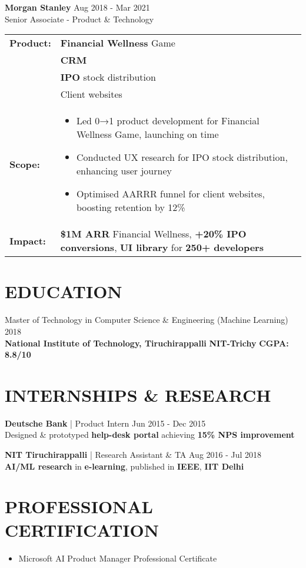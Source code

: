 \documentclass[10pt,a4paper]{article}
\newcommand{\experienceitem}[4]{
    #1 \hfill #2 \\
    #3 \hfill \textit{#4}
}
\newcommand{\educationitem}[4]{
    #1 \hfill #2 \\
    #3 \hfill #4
}
\begin{document}
\experienceitem{\textbf{Morgan Stanley}}{Aug 2018 - Mar 2021}{Senior Associate - Product \& Technology}{}

{\renewcommand{\arraystretch}{1.2}
\begin{tabularx}{\textwidth}{|>{\raggedright\arraybackslash}p{1.8cm}|X|}
\hline
\textbf{Product:} & \textbf{Financial Wellness} Game \\ & \textbf{CRM} \\ & \textbf{IPO} stock distribution \\ & Client websites \\ \hline
\textbf{Scope:} & \begin{itemize}[leftmargin=*,nosep]
    \item Led 0→1 product development for Financial Wellness Game, launching on time
    \item Conducted UX research for IPO stock distribution, enhancing user journey
    \item Optimised AARRR funnel for client websites, boosting retention by 12\%
\end{itemize} \\ \hline
\textbf{Impact:} & \textbf{\$1M ARR} Financial Wellness, \textbf{+20\% IPO conversions}, \textbf{UI library} for \textbf{250+ developers} \\ \hline
\end{tabularx}}

\section{EDUCATION}

\educationitem{Master of Technology in Computer Science \& Engineering (Machine Learning)}{ 2018}{\textbf{National Institute of Technology, Tiruchirappalli} \textbf{NIT-Trichy}}{\textbf{CGPA: 8.8/10}}

\section{INTERNSHIPS \& RESEARCH}

\textbf{Deutsche Bank} | Product Intern \hfill Jun 2015 - Dec 2015 \\
Designed \& prototyped \textbf{help-desk portal} achieving \textbf{15\% NPS improvement}

\textbf{NIT Tiruchirappalli} | Research Assistant \& TA \hfill Aug 2016 - Jul 2018 \\
\textbf{AI/ML research} in \textbf{e-learning}, published in \textbf{IEEE}, \textbf{IIT Delhi}

\section{PROFESSIONAL CERTIFICATION}

\begin{itemize}[leftmargin=*]
    \item Microsoft AI Product Manager Professional Certificate 
\end{itemize}
\end{document}

